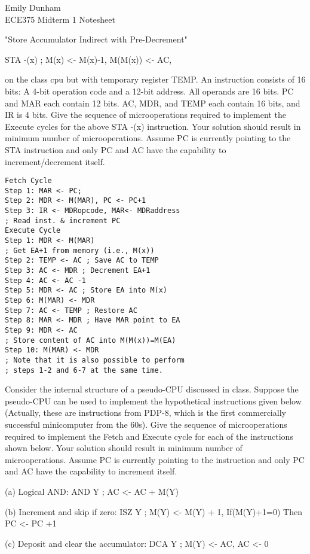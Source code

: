 \documentclass[10pt]{article}
\begin{document}
\begin{multicols}{2}
Emily Dunham\\
ECE375 Midterm 1 Notesheet

"Store Accumulator Indirect with Pre-Decrement"

STA -(x) ; M(x) <- M(x)-1, M(M(x)) <- AC,

on the class cpu but with temporary register TEMP. An instruction consists of
16 bits: A 4-bit operation code and a 12-bit address. All operands are 16
bits. PC and MAR each contain 12 bits. AC, MDR, and TEMP each contain 16 bits,
and IR is 4 bits. Give the sequence of microoperations required to implement
the Execute cycles for the above STA -(x) instruction. Your solution should
result in minimum number of microoperations. Assume PC is currently pointing 
to the STA instruction and only PC and AC have the capability to 
increment/decrement itself. 

\begin{verbatim}
Fetch Cycle
Step 1: MAR <- PC;
Step 2: MDR <- M(MAR), PC <- PC+1
Step 3: IR <- MDRopcode, MAR<- MDRaddress 
; Read inst. & increment PC
Execute Cycle
Step 1: MDR <- M(MAR) 
; Get EA+1 from memory (i.e., M(x))
Step 2: TEMP <- AC ; Save AC to TEMP
Step 3: AC <- MDR ; Decrement EA+1
Step 4: AC <- AC -1
Step 5: MDR <- AC ; Store EA into M(x)
Step 6: M(MAR) <- MDR
Step 7: AC <- TEMP ; Restore AC
Step 8: MAR <- MDR ; Have MAR point to EA
Step 9: MDR <- AC 
; Store content of AC into M(M(x))=M(EA)
Step 10: M(MAR) <- MDR
; Note that it is also possible to perform 
; steps 1-2 and 6-7 at the same time.
\end{verbatim}


Consider the internal structure of a pseudo-CPU discussed in class. Suppose
the pseudo-CPU can be used to implement the hypothetical instructions given
below (Actually, these are instructions from PDP-8, which is the first
commercially successful minicomputer from the 60s). Give the sequence of
microoperations required to implement the Fetch and Execute cycle for each of
the instructions shown below. Your solution should result in minimum number of
microoperations. Assume PC is currently pointing to the instruction and only
PC and AC have the capability to increment itself.

(a) Logical AND: AND Y ; AC <- AC + M(Y)

(b) Increment and skip if zero: 
ISZ Y ; M(Y) <- M(Y) + 1, If(M(Y)+1=0) Then PC <- PC +1

(c) Deposit and clear the accumulator: DCA
Y ; M(Y) <- AC, AC <- 0


\end{multicols}
\end{document}
